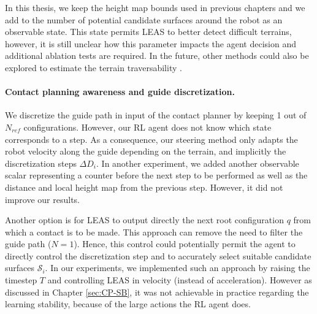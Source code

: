 In this thesis, we keep the height map bounds used in previous chapters and we add to the number of potential candidate surfaces around the robot as an observable state.
This state permits LEAS to better detect difficult terrains, however, it is still unclear how this parameter impacts the agent decision and additional ablation tests are required.
In the future, other methods could also be explored to estimate the terrain traversability \cite{lin_traversability_2018, brandao_multimode_2019}.

\paragraph{Contact planning awareness and guide discretization.}
We discretize the guide path in input of the contact planner by keeping 1 out of $N_{ref}$ configurations.
However, our RL agent does not know which state corresponds to a step.
As a consequence, our steering method only adapts the robot velocity along the guide depending on the terrain, and implicitly the discretization steps $\Delta D_i$.
In another experiment, we added another observable scalar representing a counter before the next step to be performed as well as the distance and local height map from the previous step. However, it did not improve our results.

Another option is for LEAS to output directly the next root configuration $q$ from which a contact is to be made.
This approach can remove the need to filter the guide path ($N=1$).
Hence, this control could potentially permit the agent to directly control the discretization step and to accurately select suitable candidate surfaces $\mathcal{S}_i$.
In our experiments, we implemented such an approach by raising the timestep $T$ and controlling LEAS in velocity (instead of acceleration). 
However as discussed in Chapter \ref{sec:CP-SB}, it was not achievable in practice regarding the learning stability, because of the large actions the RL agent does.

